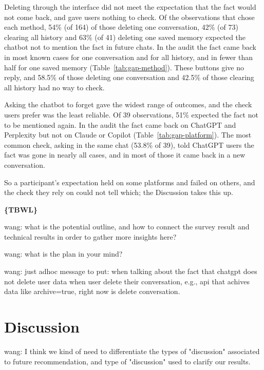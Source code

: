 \documentclass[conference,compsoc]{IEEEtran}
\newcommand{\xw}[1] {{\color{red}wang: #1}}
\begin{document}
Deleting through the interface did not meet the expectation that the fact would not come back, and gave users nothing to check.
Of the observations that chose each method, 54\% (of 164) of those deleting one conversation, 42\% (of 73) clearing all history and 63\% (of 41) deleting one saved memory expected the chatbot not to mention the fact in future chats.
In the audit the fact came back in most known cases for one conversation and for all history, and in fewer than half for one saved memory (Table~\ref{tab:gap-method}).
These buttons give no reply, and 58.5\% of those deleting one conversation and 42.5\% of those clearing all history had no way to check.

Asking the chatbot to forget gave the widest range of outcomes, and the check users prefer was the least reliable.
Of 39 observations, 51\% expected the fact not to be mentioned again.
In the audit the fact came back on ChatGPT and Perplexity but not on Claude or Copilot (Table~\ref{tab:gap-platform}).
The most common check, asking in the same chat (53.8\% of 39), told ChatGPT users the fact was gone in nearly all cases, and in most of those it came back in a new conversation.

So a participant's expectation held on some platforms and failed on others, and the check they rely on could not tell which; the Discussion takes this up.

\textbf{\{TBWL\}}

\xw{what is the potential outline, and how to connect the survey result and technical results in order to gather more insights here?}

\xw{what is the plan in your mind?}

\xw{just adhoc message to put: when talking about the fact that chatgpt does not delete user data when user delete their conversation, e.g., api that achives data like archive=true, right now is delete conversation.}

\section{Discussion}
\label{sec:discussion}

\xw{I think we kind of need to differentiate the types of "discussion" associated to future recommendation, and type of "discussion" used to clarify our results.}

\end{document}

